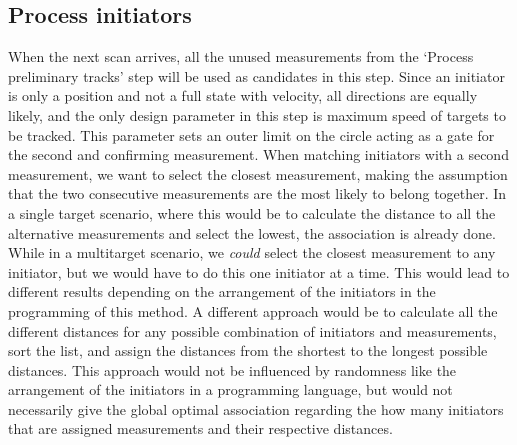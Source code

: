 \subsection{Process initiators}
When the next scan arrives, all the unused measurements from the `Process preliminary tracks' step will be used as candidates in this step. Since an initiator is only a position and not a full state with velocity, all directions are equally likely, and the only design parameter in this step is maximum speed of targets to be tracked. This parameter sets an outer limit on the circle acting as a gate for the second and confirming measurement. When matching initiators with a second measurement, we want to select the closest measurement, making the assumption that the two consecutive measurements are the most likely to belong together. In a single target scenario, where this would be to calculate the distance to all the alternative measurements and select the lowest, the association is already done. While in a multitarget scenario, we \emph{could} select the closest measurement to any initiator, but we would have to do this one initiator at a time. This would lead to different results depending on the arrangement of the initiators in the programming of this method. A different approach would be to calculate all the different distances for any possible combination of initiators and measurements, sort the list, and assign the distances from the shortest to the longest possible distances. This approach would not be influenced by randomness like the arrangement of the initiators in a programming language, but would not necessarily give the global optimal association regarding the how many initiators that are assigned measurements and their respective distances.


